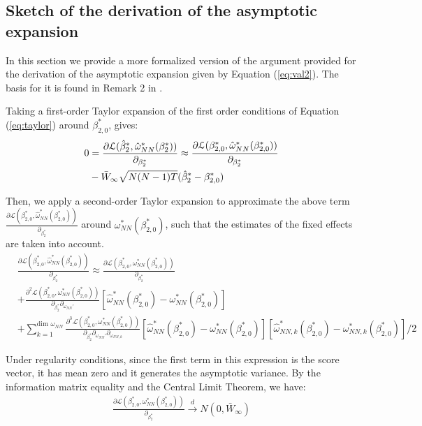 \subsection{Sketch of the derivation of the asymptotic expansion} \label{derivation_expansion}

In this section we provide a more formalized version of the argument provided for the derivation of the asymptotic expansion given by Equation (\ref{eq:val2}). The basis for it is found in Remark 2 in \cite{fernandez2016individual}.

Taking a first-order Taylor expansion of the first order conditions of Equation (\ref{eq:taylor}) around $\beta_{2,0}^*$, gives:
\begin{align} 
 0 &= \frac{\partial \mathcal{L} (\hat{\beta}_2^*, \hat{\omega}_{NN}^*(\beta_2^*))}{\partial_{\beta_2^*}}  \approx \frac{\partial \mathcal{L} ({\beta}_{2,0}^*, \hat{\omega}_{NN}^*(\beta_{2,0}^*))}{\partial_{\beta_2^*}} \nonumber \\
 &- \Bar{W}_\infty \sqrt{N(N-1)T} (\hat{\beta}_2^* - \beta_{2,0}^*)
\end{align}

Then, we apply a second-order Taylor expansion to approximate the above term $\frac{\partial  \mathcal{L} ({\beta}_{2,0}^*, \hat{\omega}_{NN}^*(\beta_{2,0}^*))}{\partial_{\beta_2^*}}$ around $\omega_{NN}^*(\beta_{2,0}^*)$, such that the estimates of the fixed effects are taken into account.
\begin{align}
    &\frac{\partial \mathcal{L} ({\beta}_{2,0}^*, \hat{\omega}_{NN}^*(\beta_{2,0}^*))}{\partial_{\beta_{2}^*}}  \approx \frac{\partial \mathcal{L} ({\beta}_{2,0}^*, {\omega}_{NN}^*(\beta_{2,0}^*))}{\partial_{\beta_{2}^*} } \\
    &+ \frac{\partial^2 \mathcal{L} ({\beta}_{2,0}^*, {\omega}_{NN}^*(\beta_{2,0}^*)) }{\partial_{\beta_{2}^*} \partial_{\omega_{NN}'} }[ \hat{\omega}_{NN}^* (\beta_{2,0}^*) - \omega_{NN}^* (\beta_{2,0}^*)]  \nonumber\\
    &+ \sum_{k = 1}^{\text{dim } \omega_{NN}} \frac{\partial^3 \mathcal{L} ({\beta}_{2,0}^*, {\omega}_{NN}^*(\beta_{2,0}^*))}{\partial_{\beta_{2}^*} \partial_{\omega_{NN}'} \partial_{\omega_{NN,k}}}[ \hat{\omega}_{NN}^* (\beta_{2,0}^*) - \omega_{NN}^* (\beta_{2,0}^*)] [ \hat{\omega}_{NN,k}^* (\beta_{2,0}^*) - \omega_{NN,k}^* (\beta_{2,0}^*)] / 2 \nonumber
\end{align}

Under regularity conditions, since the first term in this expression is the score vector, it has mean zero and it generates the asymptotic variance. By the information matrix equality and the Central Limit Theorem, we have:
\begin{align} \label{eq:exp_1}
    \frac{\partial \mathcal{L} ({\beta}_{2,0}^*, {\omega}_{NN}^*(\beta_{2,0}^*))}{\partial_{\beta_{2}^*} }  \xrightarrow{d} N(0, \bar{W}_\infty)
\end{align}

